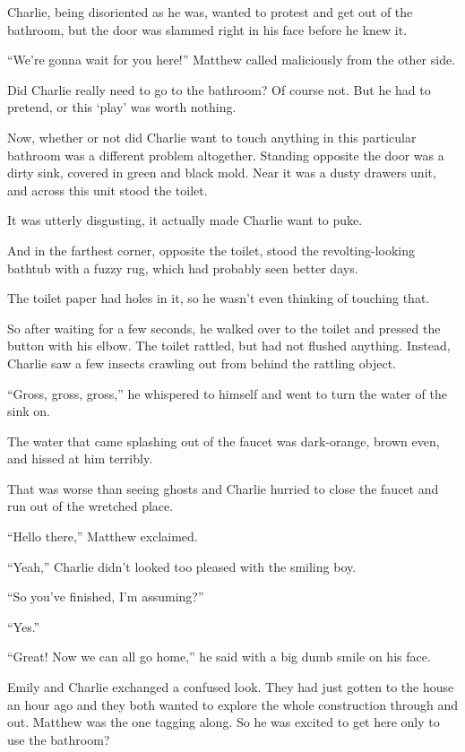 Charlie, being disoriented as he was, wanted to protest and get out of the bathroom, but the door was slammed right in his face before he knew it.

“We’re gonna wait for you here!” Matthew called maliciously from the other side.

Did Charlie really need to go to the bathroom? Of course not. But he had to pretend, or this ‘play’ was worth nothing.

Now, whether or not did Charlie want to touch anything in this particular bathroom was a different problem altogether. Standing opposite the door was a dirty sink, covered in green and black mold. Near it was a dusty drawers unit, and across this unit stood the toilet.

It was utterly disgusting, it actually made Charlie want to puke.

And in the farthest corner, opposite the toilet, stood the revolting-looking bathtub with a fuzzy rug, which had probably seen better days.

The toilet paper had holes in it, so he wasn’t even thinking of touching that.

So after waiting for a few seconds, he walked over to the toilet and pressed the button with his elbow. The toilet rattled, but had not flushed anything. Instead, Charlie saw a few insects crawling out from behind the rattling object.

“Gross, gross, gross,” he whispered to himself and went to turn the water of the sink on.

The water that came splashing out of the faucet was dark-orange, brown even, and hissed at him terribly.

That was worse than seeing ghosts and Charlie hurried to close the faucet and run out of the wretched place.

“Hello there,” Matthew exclaimed.

“Yeah,” Charlie didn’t looked too pleased with the smiling boy.

“So you’ve finished, I’m assuming?”

“Yes.”

“Great! Now we can all go home,” he said with a big dumb smile on his face.

Emily and Charlie exchanged a confused look. They had just gotten to the house an hour ago and they both wanted to explore the whole construction through and out. Matthew was the one tagging along. So he was excited to get here only to use the bathroom?

